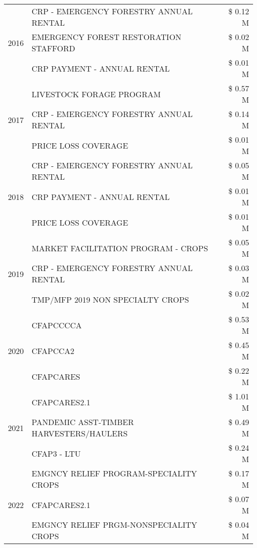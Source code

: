 \begin{tabular}{llr}
\cline{1-3}
\multirow[t]{3}{*}{2016} & CRP - EMERGENCY FORESTRY ANNUAL RENTAL & \$ 0.12 M \\
 & EMERGENCY FOREST RESTORATION STAFFORD & \$ 0.02 M \\
 & CRP PAYMENT - ANNUAL RENTAL & \$ 0.01 M \\
\cline{1-3}
\multirow[t]{3}{*}{2017} & LIVESTOCK FORAGE PROGRAM & \$ 0.57 M \\
 & CRP - EMERGENCY FORESTRY ANNUAL RENTAL & \$ 0.14 M \\
 & PRICE LOSS COVERAGE & \$ 0.01 M \\
\cline{1-3}
\multirow[t]{3}{*}{2018} & CRP - EMERGENCY FORESTRY ANNUAL RENTAL & \$ 0.05 M \\
 & CRP PAYMENT - ANNUAL RENTAL & \$ 0.01 M \\
 & PRICE LOSS COVERAGE & \$ 0.01 M \\
\cline{1-3}
\multirow[t]{3}{*}{2019} & MARKET FACILITATION PROGRAM - CROPS & \$ 0.05 M \\
 & CRP - EMERGENCY FORESTRY ANNUAL RENTAL & \$ 0.03 M \\
 & TMP/MFP 2019 NON SPECIALTY CROPS & \$ 0.02 M \\
\cline{1-3}
\multirow[t]{3}{*}{2020} & CFAPCCCCA & \$ 0.53 M \\
 & CFAPCCA2 & \$ 0.45 M \\
 & CFAPCARES & \$ 0.22 M \\
\cline{1-3}
\multirow[t]{3}{*}{2021} & CFAPCARES2.1 & \$ 1.01 M \\
 & PANDEMIC ASST-TIMBER HARVESTERS/HAULERS & \$ 0.49 M \\
 & CFAP3 - LTU & \$ 0.24 M \\
\cline{1-3}
\multirow[t]{3}{*}{2022} & EMGNCY RELIEF PROGRAM-SPECIALITY CROPS & \$ 0.17 M \\
 & CFAPCARES2.1 & \$ 0.07 M \\
 & EMGNCY RELIEF PRGM-NONSPECIALITY CROPS & \$ 0.04 M \\
\cline{1-3}
\bottomrule
\end{tabular}
